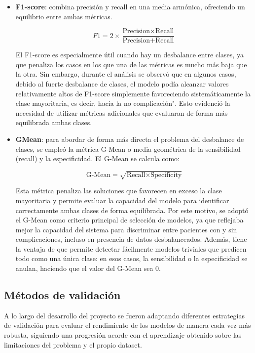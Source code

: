 \begin{itemize}
    \item \textbf{F1-score}: combina precisión y recall en una media armónica, ofreciendo un equilibrio entre ambas métricas.

    \[
    F1 = 2 \times \frac{\text{Precision} \times \text{Recall}}{\text{Precision} + \text{Recall}}
    \]

    El F1-score es especialmente útil cuando hay un desbalance entre clases, ya que penaliza los casos en los que una de las métricas es mucho más baja que la otra. Sin embargo, durante el análisis se observó que en algunos casos, debido al fuerte desbalance de clases, el modelo podía alcanzar valores relativamente altos de F1-score simplemente favoreciendo sistemáticamente la clase mayoritaria, es decir, hacia la no complicación". Esto evidenció la necesidad de utilizar métricas adicionales que evaluaran de forma más equilibrada ambas clases.

    \item \textbf{GMean}: para abordar de forma más directa el problema del desbalance de clases, se empleó la métrica G-Mean o media geométrica de la sensibilidad (recall) y la especificidad. El G-Mean se calcula como:

    \[
    \text{G-Mean} = \sqrt{\text{Recall} \times \text{Specificity}}
    \]

    Esta métrica penaliza las soluciones que favorecen en exceso la clase mayoritaria y permite evaluar la capacidad del modelo para identificar correctamente ambas clases de forma equilibrada. Por este motivo, se adoptó el G-Mean como criterio principal de selección de modelos, ya que reflejaba mejor la capacidad del sistema para discriminar entre pacientes con y sin complicaciones, incluso en presencia de datos desbalanceados. Además, tiene la ventaja de que permite detectar fácilmente modelos triviales que predicen todo como una única clase: en esos casos, la sensibilidad o la especificidad se anulan, haciendo que el valor del G-Mean sea 0.


\end{itemize}





\subsection{Métodos de validación}

A lo largo del desarrollo del proyecto se fueron adaptando diferentes estrategias de validación para evaluar el rendimiento de los modelos de manera cada vez más robusta, siguiendo una progresión acorde con el aprendizaje obtenido sobre las limitaciones del problema y el propio dataset.

